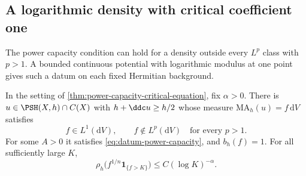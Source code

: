 \subsection{A logarithmic density with critical coefficient one}
\label{subsec:logarithmic-critical-density}

The power capacity condition can hold for a density outside every $L^p$ class with $p>1$. A bounded continuous potential with logarithmic modulus at one point gives such a datum on each fixed Hermitian background.

\begin{theorem}\label{thm:logarithmic-critical-density}
In the setting of \cref{thm:power-capacity-critical-equation}, fix $\alpha>0$. There is $u\in\PSH(X,h)\cap C(X)$ with $h+\ddc u\geq h/2$ whose measure $\mathrm{MA}_h(u)=f\,\mathrm dV$ satisfies
\[
 f\in L^1(\mathrm dV),\qquad
 f\notin L^p(\mathrm dV)\quad\text{for every }p>1.
\]
For some $A>0$ it satisfies \eqref{eq:datum-power-capacity}, and $b_h(f)=1$. For all sufficiently large $K$,
\begin{equation}\label{eq:logarithmic-root-tail}
 \rho_h\bigl(f^{1/n}\mathbf1_{\{f>K\}}\bigr)
       \leq C(\log K)^{-\alpha}.
\end{equation}
\end{theorem}
